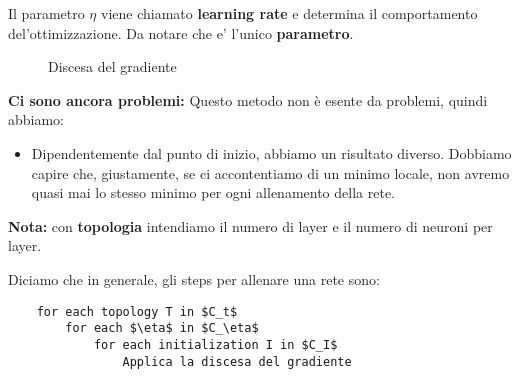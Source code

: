 Il parametro $\eta$ viene chiamato \textbf{learning rate} e determina il
comportamento del'ottimizzazione. Da notare che e' l'unico \textbf{parametro}.
\begin{figure}[H]
    \begin{center}

    \end{center}
    \caption{Discesa del gradiente}
\end{figure}

\textbf{Ci sono ancora problemi:} Questo metodo non è esente da problemi, quindi abbiamo:
\begin{itemize}
    \item Dipendentemente dal punto di inizio, abbiamo un risultato diverso. Dobbiamo
          capire che, giustamente, se ci accontentiamo di un minimo locale, non avremo
          quasi mai lo stesso minimo per ogni allenamento della rete.
\end{itemize}

\textbf{Nota:} con \textbf{topologia} intendiamo il numero di layer e il numero
di neuroni per layer.

Diciamo che in generale, gli steps per allenare una rete sono:
\lstset{mathescape}
\begin{lstlisting}
    for each topology T in $C_t$
        for each $\eta$ in $C_\eta$
            for each initialization I in $C_I$
                Applica la discesa del gradiente
\end{lstlisting}

